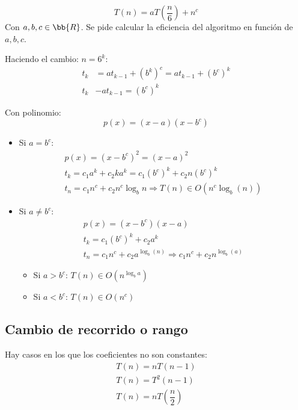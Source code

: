 \begin{ejemplo}
\begin{equation*}
    T(n) = aT\left(\dfrac{n}{6}\right) + n^c
\end{equation*}
Con $a, b, c \in \bb{R}$. Se pide calcular la eficiencia del algoritmo en función de $a, b, c$.

Haciendo el cambio: $n = 6^k$:
\begin{align*}
    t_k &= a t_{k-1} + (b^k)^c = a t_{k-1} + (b^c)^k\\
    t_k &- at_{k-1} = (b^c)^k
\end{align*}

Con polinomio:
\begin{equation*}
    p(x) = (x-a)(x-b^c)
\end{equation*}

\begin{itemize}
    \item Si $a = b^c$:
    \begin{gather*}
        p(x) = (x-b^c)^2 = (x-a)^2\\
        t_k = c_1 a^k + c_2 ka^k = c_1 (b^c)^k + c_2 n(b^c)^k\\
        t_n = c_1 n^c + c_2 n^c \log_b n \Rightarrow T(n) \in O\left(n^c \log_b(n)\right)
    \end{gather*}

    \item Si $a \neq b^c$:
    \begin{gather*}
        p(x) = (x-b^c)(x-a)\\
        t_k = c_1(b^c)^k +c_2a^k\\
        t_n = c_1 n^c + c_2 a^{\log_b(n)} \Rightarrow c_1 n^c + c_2 n^{\log_b(a)}
    \end{gather*}
    \begin{itemize}
        \item Si $a > b^c$:
            $T(n) \in O\left(n^{\log_b a}\right)$

        \item Si $a < b^c$:
            $T(n) \in O(n^c)$
    \end{itemize}
\end{itemize}
\end{ejemplo}

\subsection{Cambio de recorrido o rango}
Hay casos en los que los coeficientes no son constantes:
\begin{gather*}
    T(n) = nT(n-1)\\
    T(n) = T^2(n-1)\\
    T(n) = nT\left(\dfrac{n}{2}\right)
\end{gather*}

